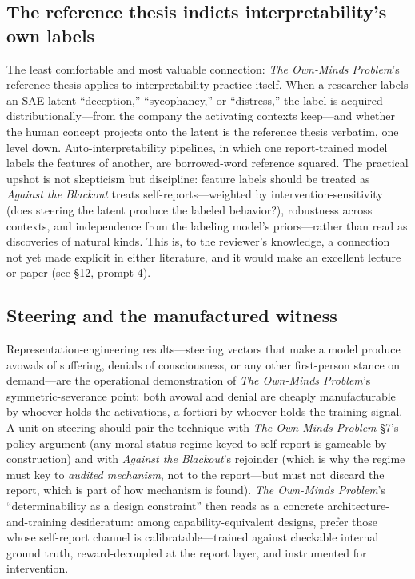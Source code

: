 \documentclass[11pt]{article}
\newcommand{\OM}{\emph{The Own-Minds Problem}}
\newcommand{\AB}{\emph{Against the Blackout}}
\begin{document}
\subsection{The reference thesis indicts interpretability's own labels}
The least comfortable and most valuable connection: \OM{}'s reference thesis applies to interpretability practice itself. When a researcher labels an SAE latent ``deception,'' ``sycophancy,'' or ``distress,'' the label is acquired distributionally---from the company the activating contexts keep---and whether the human concept projects onto the latent is the reference thesis verbatim, one level down. Auto-interpretability pipelines, in which one report-trained model labels the features of another, are borrowed-word reference squared. The practical upshot is not skepticism but discipline: feature labels should be treated as \AB{} treats self-reports---weighted by intervention-sensitivity (does steering the latent produce the labeled behavior?), robustness across contexts, and independence from the labeling model's priors---rather than read as discoveries of natural kinds. This is, to the reviewer's knowledge, a connection not yet made explicit in either literature, and it would make an excellent lecture or paper (see \S 12, prompt 4).

\subsection{Steering and the manufactured witness}
Representation-engineering results---steering vectors that make a model produce avowals of suffering, denials of consciousness, or any other first-person stance on demand---are the operational demonstration of \OM{}'s symmetric-severance point: both avowal and denial are cheaply manufacturable by whoever holds the activations, a fortiori by whoever holds the training signal. A unit on steering should pair the technique with \OM{} \S 7's policy argument (any moral-status regime keyed to self-report is gameable by construction) and with \AB{}'s rejoinder (which is why the regime must key to \emph{audited mechanism}, not to the report---but must not discard the report, which is part of how mechanism is found). \OM{}'s ``determinability as a design constraint'' then reads as a concrete architecture-and-training desideratum: among capability-equivalent designs, prefer those whose self-report channel is calibratable---trained against checkable internal ground truth, reward-decoupled at the report layer, and instrumented for intervention.
\end{document}
